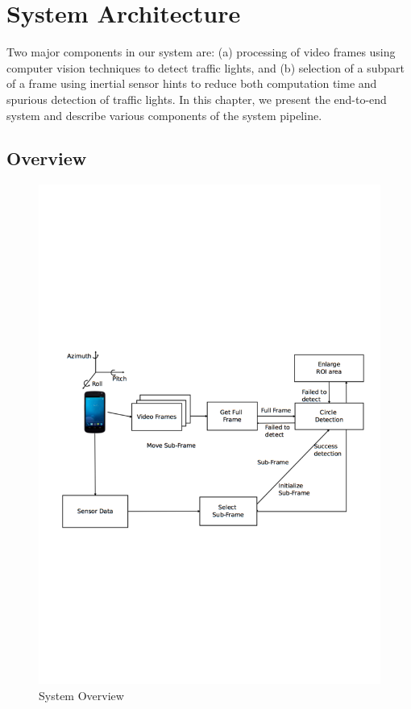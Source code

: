 \chapter{System Architecture}
\label{c:system}
Two major components in our system are: (a) processing of video frames using computer vision techniques to detect traffic lights, and (b) selection of a subpart of a frame using inertial sensor hints to reduce both computation time and spurious detection of traffic lights. 
In this chapter, we present the end-to-end system and describe various components of the system pipeline.


\section{Overview}
\label{s:overview}


\begin{figure}
\centering
\includegraphics[width=5.2in]{figures/sysdia1.pdf}
\caption{System Overview}
\label{f:sys_dia}
\end{figure}


